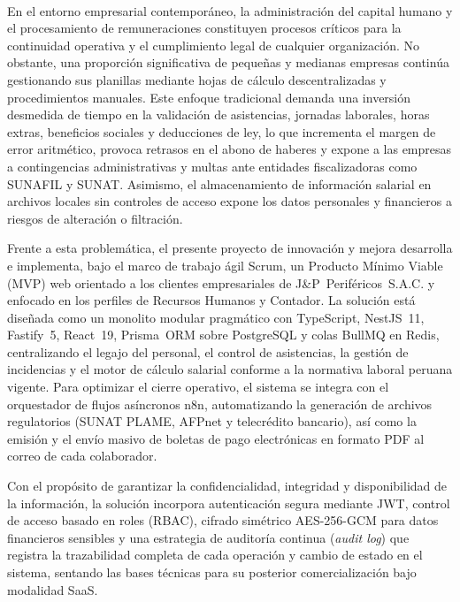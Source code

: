\clearpage
{}
{}

 \\[0.5cm]

En el entorno empresarial contemporáneo, la administración del capital humano y el procesamiento de remuneraciones 
constituyen procesos críticos para la continuidad operativa y el cumplimiento legal de cualquier organización. No obstante, 
una proporción significativa de pequeñas y medianas empresas continúa gestionando sus planillas mediante hojas de cálculo descentralizadas 
y procedimientos manuales. Este enfoque tradicional demanda una inversión desmedida de tiempo en la validación de asistencias, 
jornadas laborales, horas extras, beneficios sociales y deducciones de ley, lo que incrementa el margen de error aritmético, 
provoca retrasos en el abono de haberes y expone a las empresas a contingencias administrativas y multas ante entidades fiscalizadoras como 
SUNAFIL y SUNAT. Asimismo, el almacenamiento de información salarial en archivos locales sin controles de acceso expone los datos personales y financieros a riesgos de alteración o filtración.

Frente a esta problemática, el presente proyecto de innovación y mejora desarrolla e implementa, bajo el marco de trabajo ágil Scrum, 
un Producto Mínimo Viable (MVP) web orientado a los clientes empresariales de J\&P~Periféricos~S.A.C. y enfocado en los perfiles de Recursos Humanos y Contador. 
La solución está diseñada como un monolito modular pragmático con TypeScript, NestJS~11, Fastify~5, React~19, Prisma~ORM sobre PostgreSQL y colas BullMQ en Redis, 
centralizando el legajo del personal, el control de asistencias, la gestión de incidencias y el motor de cálculo salarial conforme a la normativa laboral peruana vigente. 
Para optimizar el cierre operativo, el sistema se integra con el orquestador de flujos asíncronos n8n, automatizando la generación de archivos regulatorios 
(SUNAT PLAME, AFPnet y telecrédito bancario), así como la emisión y el envío masivo de boletas de pago electrónicas en formato PDF al correo de cada colaborador.

Con el propósito de garantizar la confidencialidad, integridad y disponibilidad de la información, la solución incorpora autenticación segura mediante JWT, 
control de acceso basado en roles (RBAC), cifrado simétrico AES-256-GCM para datos financieros sensibles y una estrategia de auditoría continua (\textit{audit log}) 
que registra la trazabilidad completa de cada operación y cambio de estado en el sistema, sentando las bases técnicas para su posterior comercialización bajo modalidad SaaS.

